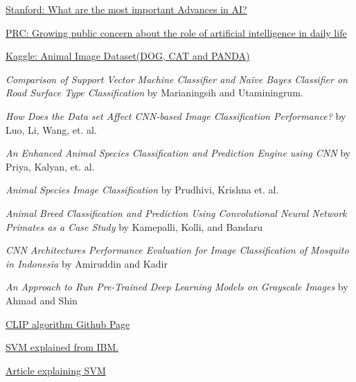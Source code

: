 \documentclass[a4paper,10pt]{article}
\begin{document}
  \begin{thebibliography}{}

     \href{https://ai100.stanford.edu/gathering-strength-gathering-storms-one-hundred-year-study-artificial-intelligence-ai100-2021-1/sq2#:~:text=In%20the%20last%20five%20years,and%20integration%20of%20vision%20and}{Stanford: What are the most important Advances in AI?}

     \href{https://www.pewresearch.org/short-reads/2023/08/28/growing-public-concern-about-the-role-of-artificial-intelligence-in-daily-life/}{PRC: Growing public concern about the role of artificial intelligence in daily life}
  
     \href{https://www.kaggle.com/datasets/ashishsaxena2209/animal-image-datasetdog-cat-and-panda}{Kaggle: Animal Image Dataset(DOG, CAT and PANDA)}

     \emph{Comparison of Support Vector Machine Classifier and Naïve Bayes Classifier on Road Surface Type Classification} by Marianingsih and Utaminingrum.

     \emph{How Does the Data set Affect CNN-based Image Classification Performance?} by Luo, Li, Wang, et. al.

     \emph{An Enhanced Animal Species Classification and Prediction Engine using CNN} by Priya, Kalyan, et. al.
  
     \emph{Animal Species Image Classification} by Prudhivi, Krishna et. al.

     \emph{Animal Breed Classification and Prediction Using Convolutional Neural Network Primates as a Case Study} by Kamepalli, Kolli, and Bandaru

     \emph{CNN Architectures Performance Evaluation for Image Classification of Mosquito in Indonesia} by Amiruddin and Kadir
    
     \emph{An Approach to Run Pre-Trained Deep Learning Models on Grayscale Images} by Ahmad and Shin

     \href{https://github.com/openai/CLIP/tree/main}{CLIP algorithm Github Page}

     \href{https://www.ibm.com/docs/en/spss-modeler/saas?topic=models-how-svm-works}{SVM explained from IBM.}

     \href{https://www.spiceworks.com/tech/big-data/articles/what-is-support-vector-machine/amp/}{Article explaining SVM}


\end{thebibliography}
\end{document}
